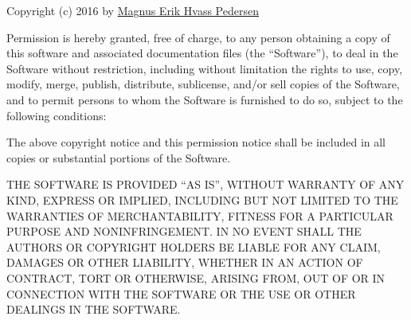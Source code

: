 \documentclass[11pt]{article}
\begin{document}
Copyright (c) 2016 by \href{http://www.hvass-labs.org/}{Magnus Erik
Hvass Pedersen}

Permission is hereby granted, free of charge, to any person obtaining a
copy of this software and associated documentation files (the
``Software''), to deal in the Software without restriction, including
without limitation the rights to use, copy, modify, merge, publish,
distribute, sublicense, and/or sell copies of the Software, and to
permit persons to whom the Software is furnished to do so, subject to
the following conditions:

The above copyright notice and this permission notice shall be included
in all copies or substantial portions of the Software.

THE SOFTWARE IS PROVIDED ``AS IS'', WITHOUT WARRANTY OF ANY KIND,
EXPRESS OR IMPLIED, INCLUDING BUT NOT LIMITED TO THE WARRANTIES OF
MERCHANTABILITY, FITNESS FOR A PARTICULAR PURPOSE AND NONINFRINGEMENT.
IN NO EVENT SHALL THE AUTHORS OR COPYRIGHT HOLDERS BE LIABLE FOR ANY
CLAIM, DAMAGES OR OTHER LIABILITY, WHETHER IN AN ACTION OF CONTRACT,
TORT OR OTHERWISE, ARISING FROM, OUT OF OR IN CONNECTION WITH THE
SOFTWARE OR THE USE OR OTHER DEALINGS IN THE SOFTWARE.


    
    
    
    
\end{document}
